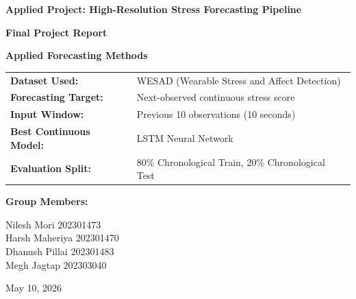 \documentclass[12pt,a4paper,oneside]{report}
\begin{document}
\begin{titlepage}
    \centering
    \vspace*{1cm}
    
    {\huge \bfseries Applied Project: High-Resolution Stress Forecasting Pipeline \par}
    \vspace{1cm}
    {\Large \bfseries Final Project Report \par}
    {\large \bfseries Applied Forecasting Methods \par}
    \vspace{1.5cm}
    
    \begin{table}[H]
        \centering
        \begin{tabular}{ll}
            \textbf{Dataset Used:} & WESAD (Wearable Stress and Affect Detection) \\
            \textbf{Forecasting Target:} & Next-observed continuous stress score \\
            \textbf{Input Window:} & Previous 10 observations (10 seconds) \\
            \textbf{Best Continuous Model:} & LSTM Neural Network \\
            \textbf{Evaluation Split:} & 80\% Chronological Train, 20\% Chronological Test \\
        \end{tabular}
    \end{table}
    
    \vspace{1.5cm}
    {\large \bfseries Group Members: \par}
    \vspace{0.5cm}
    {\large
    Nilesh Mori 202301473 \\
    Harsh Maheriya 202301470 \\
    Dhanush Pillai 202301483 \\
    Megh Jagtap 202303040 \par}
    
    \vfill
    {\large May 10, 2026 \par}
\end{titlepage}

\tableofcontents
\listoffigures
\listoftables
\end{document}
